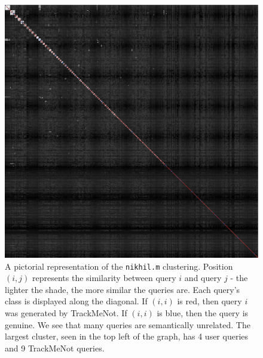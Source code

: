 \documentclass[11pt]{article}
\begin{document}
\begin{multicols}{2}
  \begin{figure}[h]
    \centering
    \includegraphics[width=\linewidth]{disco_nikhil_600.png}
    \caption{A pictorial representation of the \texttt{nikhil.m}
      clustering. Position $(i,j)$ represents the similarity between
      query $i$ and query $j$ - the lighter the shade, the more
      similar the queries are. Each query's class is displayed along
      the diagonal. If $(i,i)$ is red, then query $i$ was generated by
      TrackMeNot. If $(i,i)$ is blue, then the query is genuine. We
      see that many queries are semantically unrelated. The largest
      cluster, seen in the top left of the graph, has 4 user queries
      and 9 TrackMeNot queries.}
    \label{fig:disco.nikhil}
  \end{figure}


\end{multicols}
\end{document}
